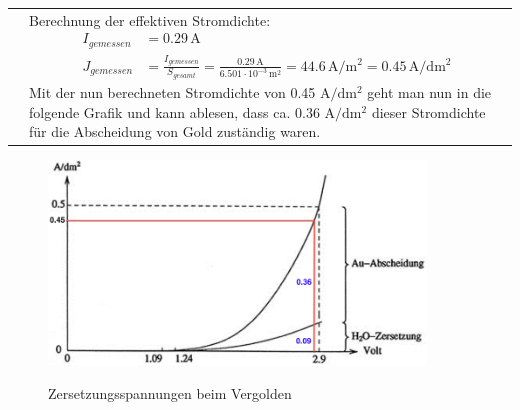 \begin{longtable}{p{3cm}p{14cm}}
    & Berechnung der effektiven Stromdichte:
    $$\begin{aligned}
        I_{gemessen} &= 0.29 \, \mathrm{A}\\
        J_{gemessen} &= \frac{I_{gemessen}}{S_{gesamt}} = \frac{0.29 \, \mathrm{A}}{6.501 \cdot 10^{-3} \, \mathrm{m^2}} = 44.6 \, \mathrm{A/m^2} = 0.45 \, \mathrm{A/dm^2}
    \end{aligned}$$
    Mit der nun berechneten Stromdichte von 0.45 $\mathrm{A/dm^2}$ geht man nun in die folgende Grafik und kann ablesen, dass ca. 0.36 $\mathrm{A/dm^2}$ dieser Stromdichte für die Abscheidung von Gold zuständig waren.
\end{longtable}
\begin{figure}[H]\centering
    \includegraphics[width=10cm]{./pictures/AuAbscheidung.png}\\
    \caption{Zersetzungsspannungen beim Vergolden}
\end{figure}

